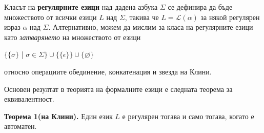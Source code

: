\documentclass{article}
\begin{document}
    \vspace{15pt}

    \hspace{15pt} Класът на \textbf{регулярните езици} над дадена азбука $\Sigma$ се дефинира
    да бъде множеството от всички езици $L$ над $\Sigma$, такива че $L = \mathscr{L}(\alpha)$ 
    за някой регулярен израз $\alpha$ над $\Sigma$. Алтернативно, можем да мислим за класа
    на регулярните езици като \textit{затварянето} на множеството от езици
    \begin{center}
        $\{\{\sigma\}$ | $\sigma \in \Sigma\} \cup \{\{\epsilon\}\} \cup \{\varnothing\}$
    \end{center}
    относно операциите обединение, конкатенация и звезда на Клини. 

    \vspace{15pt}

    \hspace{15pt} Основен резултат в теорията на формалните езици е следната теорема за еквивалентност. 

    \vspace{15pt}

    \textbf{Теорема 1(на Клини).} Един език $L$ е регулярен тогава и само тогава, когато
    е автоматен.
    
    \vspace{15pt}
\end{document}
